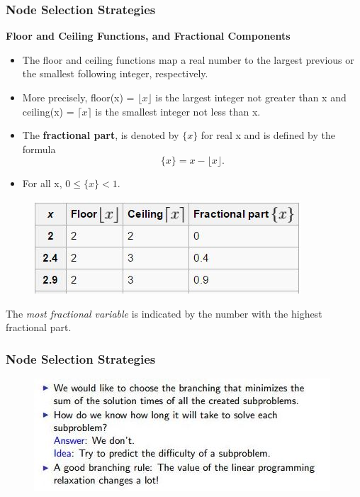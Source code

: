 \documentclass{beamer}
\begin{document}
	\begin{frame}
			\frametitle{Node Selection Strategies}
			\large
		\noindent \textbf{Floor and Ceiling Functions, and Fractional Components}
		\begin{itemize}
		\item The floor and ceiling functions map a real number to the largest previous or the smallest following integer, respectively. 
		\item More precisely, floor(x) = $\lfloor x\rfloor $ is the largest integer not greater than x and ceiling(x) =  $\lceil x \rceil$ is the smallest integer not less than x.
		\item The \textbf{fractional part}, is denoted by $\{x\}$ for real x and is defined by the formula
		\[\{x\} = x -\lfloor x\rfloor.\]
		\item For all x,
		$0\le\{x\}<1.\;$
		\end{itemize}
	\end{frame}
	\begin{frame}
		\begin{figure}
\centering
\includegraphics[width=1.0\linewidth]{floorceiling}

\end{figure}
\noindent The \textit{most fractional variable }is indicated by the number with the highest fractional part.
	\end{frame}
	\begin{frame}
		\frametitle{Node Selection Strategies}
		\large
		\begin{figure}
			\centering
			\includegraphics[width=1.1\linewidth]{NodeSelection1B}
		\end{figure}
	\end{frame}
\end{document}
